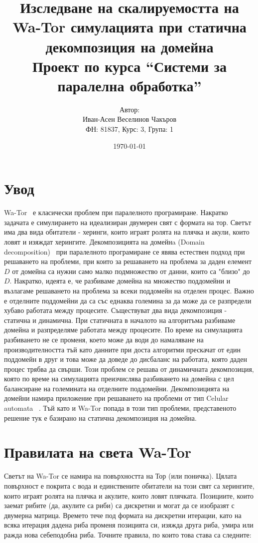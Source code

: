 \documentclass[12pt]{article}
\title{Изследване на скалируемостта на Wa-Tor симулацията при cтатична декомпозиция на домейна \\
	\large{Проект по курса ``Системи за паралелна обработка''}}
\author{Автор:\\ Иван-Асен Веселинов Чакъров \\
	ФН: 81837, Курс: 3, Група: 1}
\date{\today}
\begin{document}
\maketitle

\newpage

\tableofcontents

\newpage

\section{Увод}
Wa-Tor~\cite{wator} е класически проблем при паралелното програмиране.
Накратко задачата е симулирането на идеализиран двумерен свят с формата на тор.
Светът има два вида обитатели - херинги, които играят ролята на плячка и акули, които ловят и изяждат херингите.
\bigbreak
Декомпозицията на домейнa (Domain decomposition)~\cite{domain_decomposition}
при паралелното програмиране се явява естествен подход при решаването на проблеми,
при които за решаването на проблема за даден елемент $D$ от домейна са нужни само малко подмножество от данни,
които са "близо" до $D$. Накратко, идеята е, че разбиваме домейна на множество поддомейни
и възлагаме решаването на проблема за всеки поддомейн на отделен процес.
Важно е отделните поддомейни да са със еднаква големина за да може да се разпредели
хубаво работата между процесите. Съществуват два вида декомпозиция - статична и динамична.
При статичната в началото на алгоритъма разбиваме домейна и разпределяме работата между процесите.
По време на симулацията разбиването не се променя, което може да води до намаляване на производителността
тъй като данните при доста алгоритми прескачат от един поддомейн в друг и това може да доведе до дисбаланс
на работата, която даден процес трябва да свърши. Този проблем се решава от динамичната декомпозиция, която по време на симулацията
преизчислява разбиването на домейна с цел балансиране на големината на отделните поддомейни.
Декомпозицията на домейни намира приложение при решаването на проблеми от тип Celular automata ~\cite{celular_automata}.
\bigbreak
Тъй като и Wa-Tor попада в този тип проблеми, представеното решение тук е базирано
на статична декомпозиция на домейна.

\newpage
\section{Правилата на света Wa-Tor}

Светът на Wa-Tor се намира на повърхността на Тор (или поничка).
Цялата повърхност е покрита с вода и единствените обитатели на този свят са
херингите, които играят ролята на плячка и акулите, които ловят плячката.
Позициите, които заемат рибите (да, акулите са риби) са дискретни и могат да се изобразят с
двумерна матрица. Времето тече под формата на дискретни итерации, като на всяка
итерация дадена риба променя позицията си, изяжда друга риба, умира или ражда
нова себеподобна риба. Точните правила, по които това става са следните:
\end{document}
